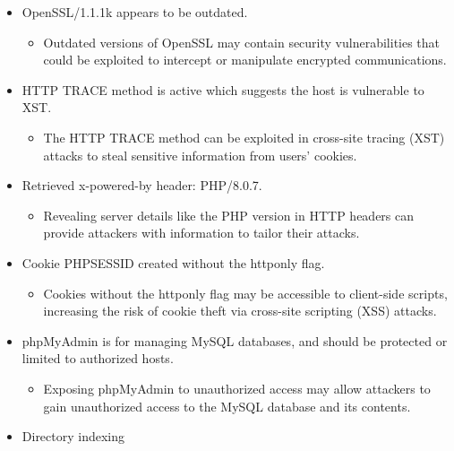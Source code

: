 \documentclass[11pt]{article}
\begin{document}
\begin{enumerate}
\begin{itemize}
              \item OpenSSL/1.1.1k appears to be outdated.
                    \begin{itemize}
                        \item Outdated versions of OpenSSL may contain security vulnerabilities that could be exploited to intercept or manipulate encrypted communications.
                    \end{itemize}

              \item HTTP TRACE method is active which suggests the host is vulnerable to XST.
                    \begin{itemize}
                        \item The HTTP TRACE method can be exploited in cross-site tracing (XST) attacks to steal sensitive information from users' cookies.
                    \end{itemize}

              \item Retrieved x-powered-by header: PHP/8.0.7.
                    \begin{itemize}
                        \item Revealing server details like the PHP version in HTTP headers can provide attackers with information to tailor their attacks.
                    \end{itemize}

              \item Cookie PHPSESSID created without the httponly flag.
                    \begin{itemize}
                        \item Cookies without the httponly flag may be accessible to client-side scripts, increasing the risk of cookie theft via cross-site scripting (XSS) attacks.
                    \end{itemize}

              \item phpMyAdmin is for managing MySQL databases, and should be protected or limited to authorized hosts.
                    \begin{itemize}
                        \item Exposing phpMyAdmin to unauthorized access may allow attackers to gain unauthorized access to the MySQL database and its contents.
                    \end{itemize}

              \item Directory indexing
          \end{itemize}


\end{enumerate}
\end{document}
